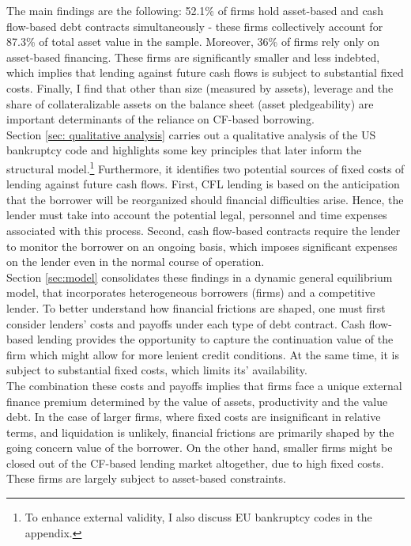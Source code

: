 \documentclass[12pt]{article}
\begin{document}
The main findings are the following: 52.1\% of firms hold asset-based and cash flow-based debt contracts simultaneously - these firms collectively account for 87.3\% of total asset value in the sample. Moreover, 36\% of firms rely only on asset-based financing. These firms are significantly smaller and less indebted, which implies that lending against future cash flows is subject to substantial fixed costs. Finally, I find that other than size (measured by assets), leverage and the share of collateralizable assets on the balance sheet (asset pledgeability) are important determinants of the reliance on CF-based borrowing. \vspace{3mm} \\
Section \ref{sec: qualitative analysis} carries out a qualitative analysis of the US bankruptcy code and highlights some key principles that later inform the structural model.\footnote{To enhance external validity, I also discuss EU bankruptcy codes in the appendix.} Furthermore, it identifies two potential sources of fixed costs of lending against future cash flows. First, CFL lending is based on the anticipation that the borrower will be reorganized should financial difficulties arise. Hence, the lender must take into account the potential legal, personnel and time expenses associated with this process. Second, cash flow-based contracts require the lender to monitor the borrower on an ongoing basis, which imposes significant expenses on the lender even in the normal course of operation. \vspace{3mm} \\
Section \ref{sec:model} consolidates these findings in a dynamic general equilibrium model, that incorporates heterogeneous borrowers (firms) and a competitive lender. To better understand how financial frictions are shaped, one must first consider lenders' costs and payoffs under each type of debt contract. Cash flow-based lending provides the opportunity to capture the continuation value of the firm which might allow for more lenient credit conditions. At the same time, it is subject to substantial fixed costs, which limits its' availability. \vspace{3mm} \\ 
The combination these costs and payoffs implies that firms face a unique external finance premium determined by the value of assets, productivity and the value debt. In the case of larger firms, where fixed costs are insignificant in relative terms, and liquidation is unlikely, financial frictions are primarily shaped by the going concern value of the borrower. On the other hand, smaller firms might be closed out of the CF-based lending market altogether, due to high fixed costs. These firms are largely subject to asset-based constraints.   \vspace{3mm} \\
\end{document}
